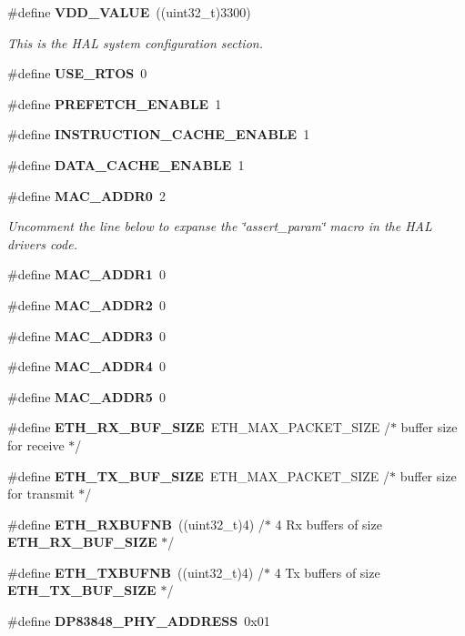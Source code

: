 \begin{DoxyCompactItemize}
\#define \textbf{ V\+D\+D\+\_\+\+V\+A\+L\+UE}~((uint32\+\_\+t)3300)
\begin{DoxyCompactList}\small\item\em This is the H\+AL system configuration section. \end{DoxyCompactList}\item 
\#define \textbf{ U\+S\+E\+\_\+\+R\+T\+OS}~0
\item 
\#define \textbf{ P\+R\+E\+F\+E\+T\+C\+H\+\_\+\+E\+N\+A\+B\+LE}~1
\item 
\#define \textbf{ I\+N\+S\+T\+R\+U\+C\+T\+I\+O\+N\+\_\+\+C\+A\+C\+H\+E\+\_\+\+E\+N\+A\+B\+LE}~1
\item 
\#define \textbf{ D\+A\+T\+A\+\_\+\+C\+A\+C\+H\+E\+\_\+\+E\+N\+A\+B\+LE}~1
\item 
\#define \textbf{ M\+A\+C\+\_\+\+A\+D\+D\+R0}~2
\begin{DoxyCompactList}\small\item\em Uncomment the line below to expanse the \char`\"{}assert\+\_\+param\char`\"{} macro in the H\+AL drivers code. \end{DoxyCompactList}\item 
\#define \textbf{ M\+A\+C\+\_\+\+A\+D\+D\+R1}~0
\item 
\#define \textbf{ M\+A\+C\+\_\+\+A\+D\+D\+R2}~0
\item 
\#define \textbf{ M\+A\+C\+\_\+\+A\+D\+D\+R3}~0
\item 
\#define \textbf{ M\+A\+C\+\_\+\+A\+D\+D\+R4}~0
\item 
\#define \textbf{ M\+A\+C\+\_\+\+A\+D\+D\+R5}~0
\item 
\#define \textbf{ E\+T\+H\+\_\+\+R\+X\+\_\+\+B\+U\+F\+\_\+\+S\+I\+ZE}~E\+T\+H\+\_\+\+M\+A\+X\+\_\+\+P\+A\+C\+K\+E\+T\+\_\+\+S\+I\+ZE /$\ast$ buffer size for receive               $\ast$/
\item 
\#define \textbf{ E\+T\+H\+\_\+\+T\+X\+\_\+\+B\+U\+F\+\_\+\+S\+I\+ZE}~E\+T\+H\+\_\+\+M\+A\+X\+\_\+\+P\+A\+C\+K\+E\+T\+\_\+\+S\+I\+ZE /$\ast$ buffer size for transmit              $\ast$/
\item 
\#define \textbf{ E\+T\+H\+\_\+\+R\+X\+B\+U\+F\+NB}~((uint32\+\_\+t)4)       /$\ast$ 4 Rx buffers of size \textbf{ E\+T\+H\+\_\+\+R\+X\+\_\+\+B\+U\+F\+\_\+\+S\+I\+ZE}  $\ast$/
\item 
\#define \textbf{ E\+T\+H\+\_\+\+T\+X\+B\+U\+F\+NB}~((uint32\+\_\+t)4)       /$\ast$ 4 Tx buffers of size \textbf{ E\+T\+H\+\_\+\+T\+X\+\_\+\+B\+U\+F\+\_\+\+S\+I\+ZE}  $\ast$/
\item 
\#define \textbf{ D\+P83848\+\_\+\+P\+H\+Y\+\_\+\+A\+D\+D\+R\+E\+SS}~0x01

\end{DoxyCompactItemize}
